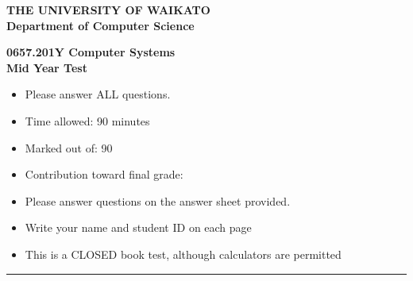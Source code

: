 \documentclass[a4paper,10pt]{article}
\begin{document}
\newcommand{\marks}[1]
{\begin{flushright}{\bf (#1 marks)}\end{flushright}}

{\centering \large \bf THE UNIVERSITY OF WAIKATO\\}
{\centering \large \bf Department of Computer Science\\[0.5cm]}

{\centering \large \bf 0657.201Y Computer Systems~\CORYEAR \\}
{\centering \large \bf Mid Year Test~\MIDTESTDATE \\[1cm]}

\begin{itemize}
  \item Please answer ALL questions.

  \item Time allowed: 90 minutes

  \item Marked out of: 90

  \item Contribution toward final grade: \MIDTESTWORTH
  
  \item Please answer questions on the answer sheet provided. 

  \item Write your name and student ID on each page

  \item This is a CLOSED book test, although calculators are permitted
\end{itemize}

\hrule
\end{document}
